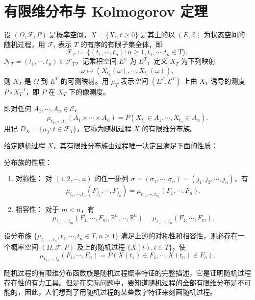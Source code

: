 \documentclass[lang=cn,10pt,thmcnt=section]{elegantbook}
\begin{document}
\section{有限维分布与 Kolmogorov 定理}

设 $(\Omega, \mathcal{F}, P)$ 是概率空间，$X = \{X_t, t \geq 0\}$ 是其上的以 $(E, \mathcal{E})$ 为状态空间的随机过程，用 $\mathcal{F}_t$ 表示 $T$ 的有序的有限子集全体，即
\[
\mathcal{F}_T := \{(t_1, \cdots, t_n) : n \geq 1, t_1, \cdots, t_n \in T\},
\]
$\mathcal{N}_T = (t_1, \cdots, t_n) \in \mathcal{F}_T$，记乘积空间 $E^n$ 为 $E^T$，定义 $X_T$ 为下列映射
\[
\omega \longmapsto (X_{t_1}(\omega), \cdots, X_{t_n}(\omega)),
\]
则 $X_T$ 是 $\Omega$ 到 $E^T$ 的可测映射。用 $\mu_T$ 表示空间 $(E^T, \mathcal{E}^T)$ 上由 $X_T$ 诱导的测度 $P \circ X_T^{-1}$，即 $P$ 在 $X_T$ 下的像测度。

即对任何 $A_1, \cdots, A_n \in \mathcal{E}$，
\[
\mu_{t_1, \cdots, t_n}(A_1 \times \cdots \times A_n) = P(X_{t_1} \in A_1, \cdots, X_{t_n} \in A_n).
\]
用记 $D_X = \{\mu_T : t \in \mathcal{F}_T\}$，它称为随机过程 $X$ 的有限维分布族。

给定随机过程 $X$，其有限维分布族由过程唯一决定且满足下面的性质：

分布族的性质：
\begin{enumerate}
    \item 对称性：
    对 $(1, 2, \cdots, n)$ 的任一排列 $\sigma = (\sigma_1, \cdots, \sigma_n) = (j_1, j_2, \cdots, j_n)$，有
    \[
    \mu_{t_1, \cdots, t_n}(F_{j_1}, \cdots, F_{j_n}) = \mu_{t_{\sigma_1}, \cdots, t_{\sigma_n}}(F_1, \cdots, F_n).
    \]
    \item 相容性：
    对于 $m < n$，有
    \[
    \mu_{t_1, \cdots, t_m}(F_1, \cdots, F_m, \mathbb{R}^n, \cdots, \mathbb{R}^n) = \mu_{t_1, \cdots, t_n}(F_1, \cdots, F_m).
    \]
\end{enumerate}
\begin{theorem}
	设分布族 $\{\mu_{t_1, \cdots, t_n}, t_1, \cdots, t_n \in T, n \geq 1\}$ 满足上述的对称性和相容性，则必存在一个概率空间 $(\Omega, \mathcal{F}, P)$ 及上的随机过程 $\{X(t), t \in T\}$，使
\[
\mu_{t_1, \cdots, t_n}(F_1, \cdots, F_n) = P(X(t_1) \in F_1, \cdots, X(t_n) \in F_n).
\]
\end{theorem}
\begin{remark}
	随机过程的有限维分布函数族是随机过程概率特征的完整描述，它是证明随机过程存在性的有力工具。但是在实际问题中，要知道随机过程的全部有限维分布是不可能的，因此，人们想到了用随机过程的某些数字特征来刻画随机过程。
\end{remark}
\end{document}
